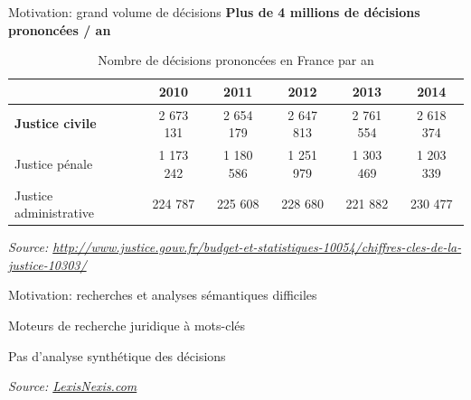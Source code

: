 \documentclass[newPxFont,pagenumber]{beamer}
\begin{document}
\begin{frame}[c]{Motivation: grand volume de décisions}
\textbf{Plus de 4 millions de décisions prononcées / an}
\begin{table}[!htb]
{
\footnotesize
\begin{center}
\begin{tabular}{|p{2cm}|c|c|c|c|c|}
\hline
 & \textbf{2010} & \textbf{2011} & \textbf{2012} & \textbf{2013} & \textbf{2014} \\
 \hline
 \textbf{Justice civile} & 2 673 131  & 2 654 179 & 2 647 813 & 2 761 554  & 2 618 374 \\
 \hline
Justice pénale & 1 173 242 & 1 180 586 & 1 251 979 & 1 303 469 & 1 203 339 \\
 \hline
 Justice administrative & 224 787 & 225 608 & 228 680 & 221 882 & 230 477 \\
 \hline
\end{tabular}

\textit{\tiny{Source: \url{http://www.justice.gouv.fr/budget-et-statistiques-10054/chiffres-cles-de-la-justice-10303/}}}  
\end{center}
}
\caption{Nombre de décisions prononcées en France par an}\label{decisionstats}
\end{table}
\end{frame}

\begin{frame}[t]{Motivation: recherches et analyses sémantiques difficiles}

Moteurs de recherche juridique à mots-clés 

Pas d'analyse synthétique des décisions 


\textit{\tiny{Source: \url{LexisNexis.com}}} 
\end{frame}
\end{document}

